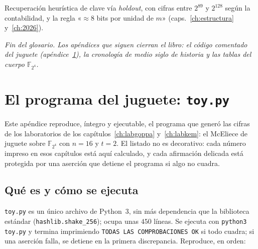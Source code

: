 \documentclass[11pt,a4paper,oneside]{report}
\newcommand{\F}{\mathbb{F}}
\newcommand{\FF}[1]{\F_{2^{#1}}}
\begin{document}
\begin{description}[leftmargin=2.6em,style=nextline,itemsep=2.5pt,parsep=0pt]
  \item[\textbf{Weis (ataques de 2026)}]
        Recuperación heurística de clave vía \emph{holdout},
        con cifras entre $2^{89}$ y $2^{128}$ según la
        contabilidad, y la regla «$\approx8$ bits por unidad de
        $m$» (caps.~\ref{ch:estructura} y~\ref{ch:2026}).

\end{description}

\medskip
\noindent\textit{Fin del glosario. Los apéndices que siguen cierran el
libro: el código comentado del juguete (apéndice~\ref{app:codigo}),
la cronología de medio siglo de historia y las tablas del cuerpo
$\FF4$.}


\appendix
\chapter{El programa del juguete: \texttt{toy.py}}\label{app:codigo}

\begin{roadmap}
Este apéndice reproduce, íntegro y ejecutable, el programa que generó
las cifras de los laboratorios de los
capítulos~\ref{ch:labgoppa} y~\ref{ch:labkem}: el McEliece de juguete
sobre $\FF4$ con $n=16$ y $t=2$. El listado no es decorativo: cada
número impreso en esos capítulos está aquí calculado, y cada
afirmación delicada está protegida por una aserción que detiene el
programa si algo no cuadra.
\end{roadmap}

\section{Qué es y cómo se ejecuta}

\texttt{toy.py} es un único archivo de Python~3, sin más dependencia
que la biblioteca estándar (\texttt{hashlib.shake\_256}); ocupa unas
$450$ líneas. Se ejecuta con \texttt{python3 toy.py} y termina
imprimiendo \texttt{TODAS LAS COMPROBACIONES OK} si todo cuadra; si
una aserción falla, se detiene en la primera discrepancia. Reproduce,
en orden:
\end{document}
